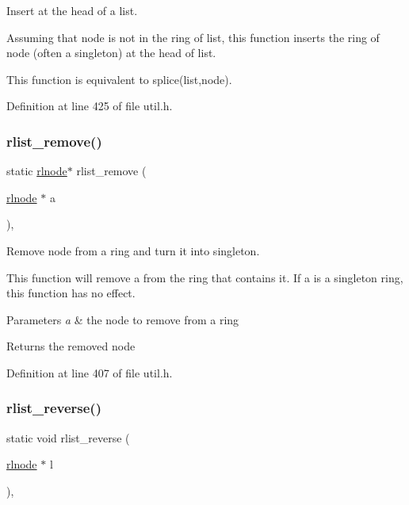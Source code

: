 Insert at the head of a list. 

Assuming that {\ttfamily node} is not in the ring of {\ttfamily list}, this function inserts the ring of {\ttfamily node} (often a singleton) at the head of {\ttfamily list}.

This function is equivalent to {\ttfamily splice(list,node)}. 

Definition at line 425 of file util.\+h.

\mbox{\label{group__rlists_ga9177b286dcefd1d853aae220a98d3c7b}} 
\subsubsection{\texorpdfstring{rlist\+\_\+remove()}{rlist\_remove()}}
{\footnotesize\ttfamily static \hyperlink{group__rlists_ga8f6244877f7ce2322c90525217ea6e7a}{rlnode}$\ast$ rlist\+\_\+remove (\begin{DoxyParamCaption}\item[{\hyperlink{group__rlists_ga8f6244877f7ce2322c90525217ea6e7a}{rlnode} $\ast$}]{a }\end{DoxyParamCaption})\hspace{0.3cm}{\ttfamily [inline]}, {\ttfamily [static]}}



Remove node from a ring and turn it into singleton. 

This function will remove {\ttfamily a} from the ring that contains it. If {\ttfamily a} is a singleton ring, this function has no effect. 
\begin{DoxyParams}{Parameters}
{\em a} & the node to remove from a ring \\
\hline
\end{DoxyParams}
\begin{DoxyReturn}{Returns}
the removed node 
\end{DoxyReturn}


Definition at line 407 of file util.\+h.

\mbox{\label{group__rlists_ga3911836f21f2f50b4caa2fa1d8e1f1de}} 
\subsubsection{\texorpdfstring{rlist\+\_\+reverse()}{rlist\_reverse()}}
{\footnotesize\ttfamily static void rlist\+\_\+reverse (\begin{DoxyParamCaption}\item[{\hyperlink{group__rlists_ga8f6244877f7ce2322c90525217ea6e7a}{rlnode} $\ast$}]{l }\end{DoxyParamCaption})\hspace{0.3cm}{\ttfamily [inline]}, {\ttfamily [static]}}



